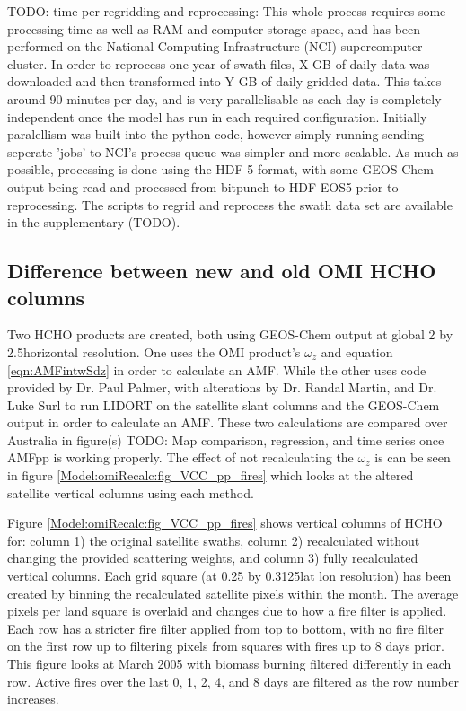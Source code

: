     TODO: time per regridding and reprocessing:
    This whole process requires some processing time as well as RAM and computer storage space, and has been performed on the National Computing Infrastructure (NCI) supercomputer cluster.
    In order to reprocess one year of swath files, X GB of daily data was downloaded and then transformed into Y GB of daily gridded data.
    This takes around 90 minutes per day, and is very parallelisable as each day is completely independent once the model has run in each required configuration.
    Initially paralellism was built into the python code, however simply running sending seperate 'jobs' to NCI's process queue was simpler and more scalable.
    As much as possible, processing is done using the HDF-5 format, with some GEOS-Chem output being read and processed from bitpunch to HDF-EOS5 prior to reprocessing.
    The scripts to regrid and reprocess the swath data set are available in the supplementary (TODO).
  
  \subsection{Difference between new and old OMI HCHO columns}
  
    
    Two HCHO products are created, both using GEOS-Chem output at global 2 by 2.5\degr horizontal resolution.
    One uses the OMI product's $\omega_z$ and equation \ref{eqn:AMFintwSdz} in order to calculate an AMF.
    While the other uses code provided by Dr. Paul Palmer, with alterations by Dr. Randal Martin, and Dr. Luke Surl to run LIDORT on the satellite slant columns and the GEOS-Chem output in order to calculate an AMF.
    These two calculations are compared over Australia in figure(s) TODO: Map comparison, regression, and time series once AMFpp is working properly.
    The effect of not recalculating the $\omega_z$ is can be seen in figure \ref{Model:omiRecalc:fig_VCC_pp_fires} which looks at the altered satellite vertical columns using each method.
    
    Figure \ref{Model:omiRecalc:fig_VCC_pp_fires} shows vertical columns of HCHO for: column 1) the original satellite swaths, column 2) recalculated without changing the provided scattering weights, and column 3) fully recalculated vertical columns. 
    Each grid square (at 0.25 by 0.3125\degr lat lon resolution) has been created by binning the recalculated satellite pixels within the month.
    The average pixels per land square is overlaid and changes due to how a fire filter is applied.
    Each row has a stricter fire filter applied from top to bottom, with no fire filter on the first row up to filtering pixels from squares with fires up to 8 days prior.
    This figure looks at March 2005 with biomass burning filtered differently in each row.
    Active fires over the last 0, 1, 2, 4, and 8 days are filtered as the row number increases.
    
